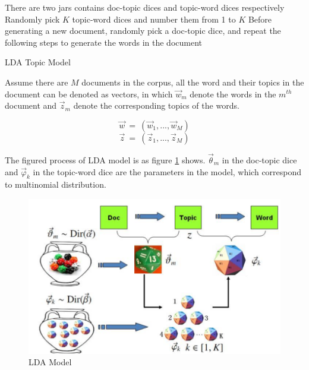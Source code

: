 \begin{algorithm}[H]
  There are two jars contains doc-topic dices and topic-word dices respectively\;
  Randomly pick $K$ topic-word dices and number them from 1 to $K$\;
  Before generating a new document, randomly pick a doc-topic dice, and repeat the following steps to generate the words in the document\;
  \caption{LDA Topic Model}
\end{algorithm}

Assume there are $M$ documents in the corpus, all the word and their topics in the document can be denoted as vectors, in which $\vec w_m$ denote the words in the $m^{th}$ document and $\vec z_m$ denote the corresponding topics of the words. 

$$\vec w\ =\ (\vec w_1,...,\vec w_M)$$
$$\vec z\ =\ (\vec z_1,...,\vec z_M)$$


The figured process of LDA model is as figure \ref{fig:5} shows. $\vec \theta_m$ in the doc-topic dice and $\vec \varphi_k$ in the topic-word dice are the parameters in the model, which correspond to multinomial distribution. 

\begin{figure}[H]
    \centering
    \includegraphics[scale=0.6]{images/LDA_model.png}
    \caption{LDA Model \cite{jin_2013}}
    \label{fig:5}
\end{figure} 

